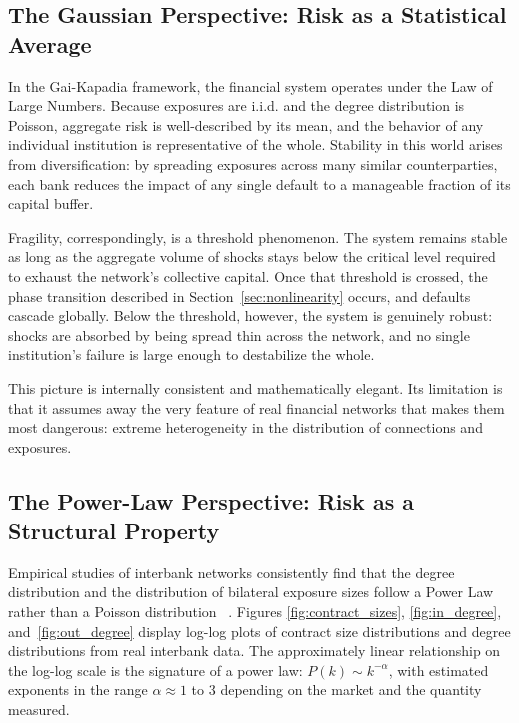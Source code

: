 \documentclass[a4paper,12pt,twoside]{article}
\begin{document}
\subsection{The Gaussian Perspective: Risk as a Statistical Average}
\label{sec:gaussian_perspective}

In the Gai-Kapadia framework, the financial system operates under the 
Law of Large Numbers. Because exposures are i.i.d. and the degree 
distribution is Poisson, aggregate risk is well-described by its mean, 
and the behavior of any individual institution is representative of 
the whole. Stability in this world arises from diversification: by 
spreading exposures across many similar counterparties, each bank 
reduces the impact of any single default to a manageable fraction of 
its capital buffer.

Fragility, correspondingly, is a threshold phenomenon. The system 
remains stable as long as the aggregate volume of shocks stays below 
the critical level required to exhaust the network's collective 
capital. Once that threshold is crossed, the phase transition described 
in Section~\ref{sec:nonlinearity} occurs, and defaults cascade 
globally. Below the threshold, however, the system is genuinely 
robust: shocks are absorbed by being spread thin across the network, 
and no single institution's failure is large enough to destabilize the 
whole.

This picture is internally consistent and mathematically elegant. Its 
limitation is that it assumes away the very feature of real financial 
networks that makes them most dangerous: extreme heterogeneity in the 
distribution of connections and exposures.

\subsection{The Power-Law Perspective: Risk as a Structural Property}
\label{sec:powerlaw_perspective}

Empirical studies of interbank networks consistently find that the 
degree distribution and the distribution of bilateral exposure sizes 
follow a Power Law rather than a Poisson distribution ~\cite{iori2008, 
boss2004}. Figures 
\ref{fig:contract_sizes}, \ref{fig:in_degree}, 
and~\ref{fig:out_degree} display log-log plots of contract size 
distributions and degree distributions from real interbank data. The 
approximately linear relationship on the log-log scale is the 
signature of a power law: $P(k) \sim k^{-\alpha}$, with estimated 
exponents in the range $\alpha \approx 1$ to $3$ depending on the 
market and the quantity measured.
\end{document}
